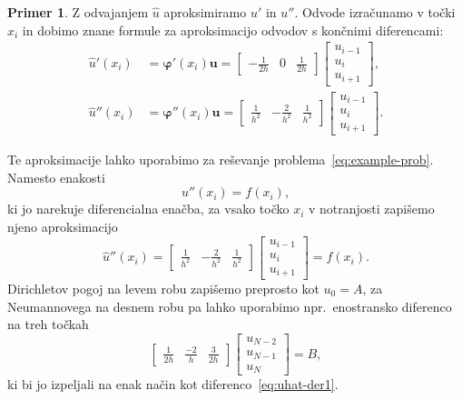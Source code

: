 \documentclass[12pt,a4paper,twoside]{article}
\theoremstyle{definition} %
\newtheorem{primer}[definicija]{Primer}
\theoremstyle{plain} %
\numberwithin{equation}{section}
\renewcommand{\b}{\boldsymbol}
\renewcommand{\phi}{\varphi}
\begin{document}
\begin{primer}
Z odvajanjem $\hat{u}$ aproksimiramo $u'$ in $u''$. Odvode izračunamo v točki $x_i$ in dobimo znane
formule za aproksimacijo odvodov s končnimi diferencami:
\begin{align}
  \hat u'(x_i) &= \b\phi'(x_i) \b u =
  \begin{bmatrix}
    -\frac{1}{2h} & 0 & \frac{1}{2h}
  \end{bmatrix} \begin{bmatrix}
    u_{i-1} \\ u_{i} \\ u_{i+1}
  \end{bmatrix}, \label{eq:uhat-der1} \\
  \hat u''(x_i) &= \b\phi''(x_i) \b u =
  \begin{bmatrix}
    \frac{1}{h^2} & -\frac{2}{h^2} & \frac{1}{h^2}
  \end{bmatrix}\begin{bmatrix}
    u_{i-1} \\ u_{i} \\ u_{i+1}
  \end{bmatrix}.
\end{align}

Te aproksimacije lahko uporabimo za reševanje problema~\eqref{eq:example-prob}.
Namesto enakosti
\begin{equation}
  u''(x_i) = f(x_i),
\end{equation}
ki jo narekuje diferencialna enačba, za vsako točko $x_i$ v notranjosti zapišemo njeno aproksimacijo
\begin{equation}
  \hat{u}''(x_i) =
  \begin{bmatrix}
    \frac{1}{h^2} & -\frac{2}{h^2} & \frac{1}{h^2}
  \end{bmatrix}\begin{bmatrix}
    u_{i-1} \\ u_{i} \\ u_{i+1}
  \end{bmatrix} = f(x_i).
\end{equation}
Dirichletov pogoj na levem robu zapišemo preprosto kot $u_0 = A$,
za Neumannovega na desnem robu pa lahko uporabimo npr.~enostransko diferenco
na treh točkah \[
  \begin{bmatrix}
    \frac{1}{2h} & \frac{-2}{h} & \frac{3}{2h}
  \end{bmatrix}\begin{bmatrix}
    u_{N-2} \\ u_{N-1} \\ u_{N}
  \end{bmatrix} = B,
\]
ki bi jo izpeljali na enak način kot diferenco~\eqref{eq:uhat-der1}.


\end{primer}
\end{document}
